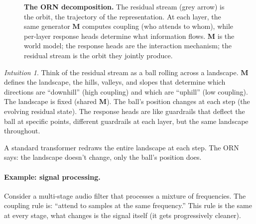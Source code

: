 \documentclass[11pt, a4paper]{article}
\newcommand{\M}{\mathbf{M}}
\newcommand{\x}{\mathbf{x}}
\theoremstyle{remark}
\newtheorem*{intuition}{Intuition}
\begin{document}
\begin{figure}[h]
\caption{\textbf{The ORN decomposition.}
The residual stream (grey arrow) is the orbit, the trajectory of the representation.
At each layer, the \textcolor{orbitblue}{same generator $\M$} computes coupling
(who attends to whom), while \textcolor{dynamicsorange!80!black}{per-layer response heads}
determine what information flows.
$\M$ is the world model; the response heads are the interaction mechanism;
the residual stream is the orbit they jointly produce.}
\label{fig:grn-decomposition}
\end{figure}

\begin{intuition}
Think of the residual stream as a ball rolling across a landscape.
$\M$ defines the landscape, the hills, valleys, and slopes that determine which
directions are ``downhill'' (high coupling) and which are ``uphill'' (low coupling).
The landscape is fixed (shared $\M$).
The ball's position changes at each step (the evolving residual state).
The response heads are like guardrails that deflect the ball at specific points, 
different guardrails at each layer, but the same landscape throughout.

A standard transformer redraws the entire landscape at each step.
The ORN says: the landscape doesn't change, only the ball's position does.
\end{intuition}

\paragraph{Example: signal processing.}
Consider a multi-stage audio filter that processes a mixture of frequencies.
The coupling rule is: ``attend to samples at the same frequency.''
This rule is the same at every stage, what changes is the signal itself (it gets progressively cleaner).
\end{document}
